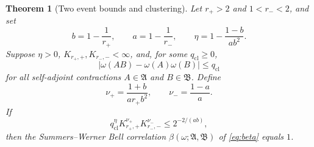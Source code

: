 \documentclass[11pt]{amsart}
\numberwithin{equation}{section}
\newtheorem{theorem}{Theorem}[section]
\theoremstyle{definition}
\newcommand{\A}{\mathfrak A}
\newcommand{\B}{\mathfrak B}
\begin{document}
\begin{theorem}[Two event bounds and clustering]\label{thm:probability}
Let \(r_+>2\) and \(1<r_-<2\), and set
\begin{equation}
 b=1-\frac1{r_+},\qquad
 a=1-\frac1{r_-},\qquad
 \eta=1-\frac{1-b}{ab^2}.
 \label{eq:probability-exponents}
\end{equation}
Suppose \(\eta>0\), \(K_{r_+,+},K_{r_-,-}<\infty\), and, for some
\(q_{\mathrm{cl}}\ge0\),
\begin{equation}
 |\omega(AB)-\omega(A)\omega(B)|\le q_{\mathrm{cl}}
 \label{eq:additive-cluster}
\end{equation}
for all self-adjoint contractions \(A\in\A\) and \(B\in\B\). Define
\begin{equation}
 \nu_+=\frac{1+b}{ar_+b^2},\qquad
 \nu_-=\frac{1-a}{a}.
 \label{eq:nus}
\end{equation}
If
\begin{equation}
 q_{\mathrm{cl}}^\eta
 K_{r_+,+}^{\nu_+}K_{r_-,-}^{\nu_-}
 \le 2^{-2/(ab)},
 \label{eq:probability-cutoff}
\end{equation}
then the Summers--Werner Bell correlation \(\beta(\omega;\A,\B)\) of
\eqref{eq:beta} equals \(1\).
\end{theorem}
\end{document}
